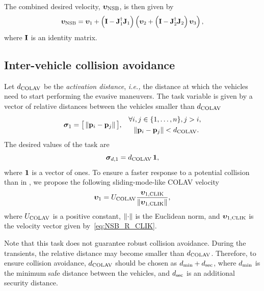 The combined desired velocity, $\bm{\upsilon}_{\rm NSB}$, is then given by \cite{antonelli_2006_kinematic}
\begin{equation} 
    \scale[0.95]{\bs{\upsilon}_{\rm NSB} = \bs{\upsilon}_1 + \left(\mat{I} - \mat{J}_1^{\dagger}\mat{J}_1\right)\left(\bs{\upsilon}_2 + \left(\mat{I} - \mat{J}_2^{\dagger}\mat{J}_2\right)\bs{\upsilon}_3\right),} \label{eq:NSB_R_NSB_with_COLAV}
\end{equation}
where $\mathbf{I}$ is an identity matrix.

\subsection{Inter-vehicle collision avoidance}
\label{sec:NSB_R_COLAV}

Let {$d_{\rm COLAV}$} be the \emph{activation distance}, \emph{i.e.,} the distance at which the vehicles need to start performing the evasive maneuvers.
The task variable is given by a vector of relative distances between the vehicles smaller than $d_{\rm COLAV}$
\begin{align}
        \bm{\sigma}_1 &= \big[\left\|\mathbf{p}_i - \mathbf{p}_j\right\|\big], &
        \begin{split} 
            \forall &i,j\in\{1,\ldots,n\}, j > i, \\
            &\left\|\mathbf{p}_i - \mathbf{p}_j\right\| < d_{\rm COLAV}.
        \end{split}
\end{align}
The desired values of the task are 
\begin{equation}
    \bm{\sigma}_{d,1} = d_{\rm COLAV} \, \mathbf{1},
\end{equation}
where $\mathbf{1}$ is a vector of ones.
To ensure a faster response to a potential collision than in \cite{matouvs_formation_2022}, we propose the following sliding-mode-like COLAV velocity 
\begin{equation}
    \bm{\upsilon}_1 = U_{\rm COLAV} \frac{\bm{\upsilon}_{1, {\rm CLIK}}}{\left\|\bm{\upsilon}_{1, {\rm CLIK}}\right\|},
\end{equation}
where $U_{\rm COLAV}$ is a positive constant, $\left\|\cdot\right\|$ is the Euclidean norm, and $\bm{\upsilon}_{1, {\rm CLIK}}$ is the velocity vector given by~\eqref{eq:NSB_R_CLIK}.

Note that this task does not guarantee robust collision avoidance.
During the transients, the relative distance may become smaller than $d_{\rm COLAV}$.
Therefore, to ensure collision avoidance, $d_{\rm COLAV}$ should be chosen as $d_{\rm min} + d_{\rm sec}$, where $d_{\rm min}$ is the minimum safe distance between the vehicles, and $d_{\rm sec}$ is an additional security distance.

